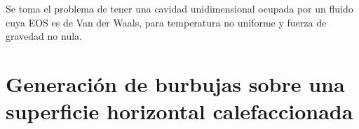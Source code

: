 Se toma el problema de tener una cavidad unidimensional ocupada por un fluido cuya EOS es de Van der Waals, para temperatura no uniforme y fuerza de gravedad no nula.



\section{Generación de burbujas sobre una superficie horizontal calefaccionada}
